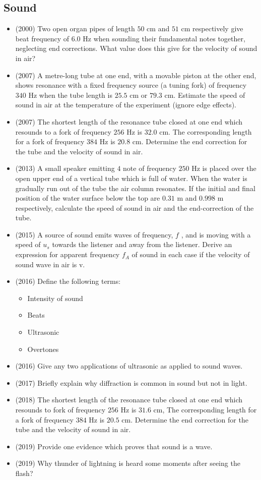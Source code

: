 \documentclass{article}
\begin{document}
\subsection{Sound}
\begin{itemize}
\item (2000)  Two open organ pipes of length $ 50$ cm and $ 51$ cm respectively give beat frequency of $ 6.0$ Hz when sounding their fundamental notes together, neglecting end corrections. What value does this give for the velocity of sound in air?
\item (2007)  A metre-long tube at one end, with a movable piston at the other end, shows resonance with a fixed frequency source (a tuning fork) of frequency $ 340$ Hz when the tube length is $ 25.5$ cm or $ 79.3$ cm.  Estimate the speed of sound in air at the temperature of the experiment (ignore edge effects).
\item (2007)  The shortest length of the resonance tube closed at one end which resounds to a fork of frequency $ 256$ Hz is $ 32.0$ cm.  The corresponding length for a fork of frequency $ 384$ Hz is $ 20.8$ cm.  Determine the end correction for the tube and the velocity of sound in air.
\item (2013)  A small speaker emitting $ 4$ note of frequency $ 250$ Hz is placed over the open upper end of a vertical tube which is full of water. When the water is gradually run out of the tube the air column resonates. If the initial and final position of the water surface below the top are $ 0.31$ m and $ 0.998$ m respectively, calculate the speed of sound in air and the end-correction of the tube. 
\item (2015)  A source of sound emits waves of frequency, $ f$ , and is moving with a speed of $ u_{s}$ towards the listener and away from the listener.  Derive an expression for apparent frequency $ f_{A}$ of sound in each case if the velocity of sound wave in air is v.  
\item (2016)  Define the following terms:\begin{itemize}
\item Intensity of sound
\item Beats
\item Ultrasonic
\item Overtones
\end{itemize}
\item (2016)  Give any two applications of ultrasonic as applied to sound waves.
\item (2017)  Briefly explain why diffraction is common in sound but not in light.
\item (2018)  The shortest length of the resonance tube closed at one end which resounds to fork of frequency $ 256$ Hz is $ 31.6$ cm, The corresponding length for a fork of frequency $ 384$ Hz is $ 20.5$ cm. Determine the end correction for the tube and the velocity of sound in air. 
\item (2019)  Provide one evidence which proves that sound is a wave.
\item (2019)  Why thunder of lightning is heard some moments after seeing the flash?
\end{itemize}
\end{document}
